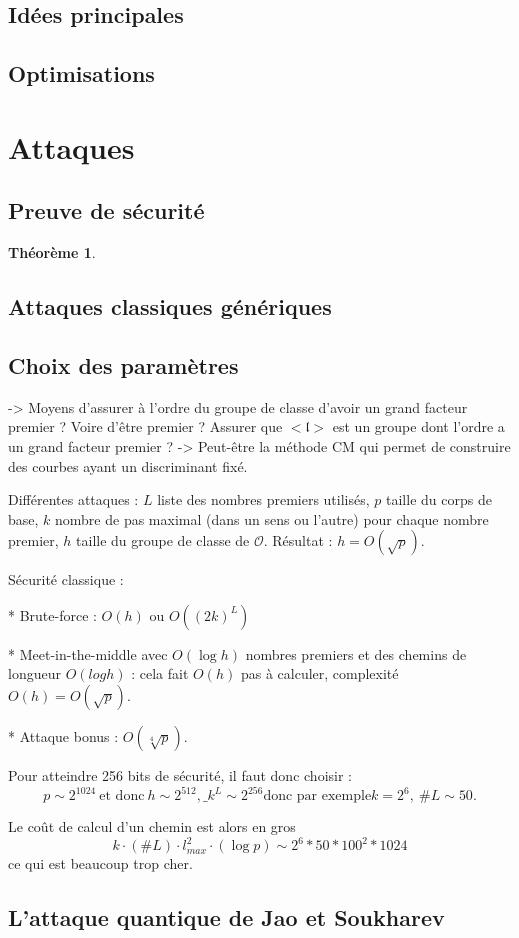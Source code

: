 \documentclass[11pt,a4paper]{article}
\renewcommand{\O}{\mathcal{O}}
\renewcommand{\frak}{\mathfrak}
\newtheorem{thm}{Théorème}[subsection]
\theoremstyle{definition}
\begin{document}
\subsection{Idées principales}

\subsection{Optimisations}


\newpage

\section{Attaques}


\subsection{Preuve de sécurité}


\begin{thm}

\end{thm}


\subsection{Attaques classiques génériques}


\subsection{Choix des paramètres}

-> Moyens d'assurer à l'ordre du groupe de classe d'avoir un grand facteur premier ? Voire d'être premier ? Assurer que $<\frak l>$ est un groupe dont l'ordre a un grand facteur premier ?
-> Peut-être la méthode CM qui permet de construire des courbes ayant un discriminant fixé.

Différentes attaques :
$L$ liste des nombres premiers utilisés, $p$ taille du corps de base, $k$ nombre de pas maximal (dans un sens ou l'autre) pour chaque nombre premier, $h$ taille du groupe de classe de $\O$. Résultat : $h=O(\sqrt{p})$.

Sécurité classique :

* Brute-force : $O(h)$ ou $O((2k)^L)$

* Meet-in-the-middle avec $O(\log h)$ nombres premiers et des chemins de longueur $O(log h)$ : cela fait $O(h)$ pas à calculer, complexité $O(h)=O(\sqrt{p})$.

* Attaque bonus : $O(\sqrt[4]{p})$.

Pour atteindre 256 bits de sécurité, il faut donc choisir :
$$p\sim 2^{1024}\ \text{et donc}\ h\sim 2^{512},\_ k^L\sim 2^{256} \text{donc par exemple} k=2^6,\ \#L\sim 50.$$

Le coût de calcul d'un chemin est alors en gros
$$k\cdot(\#L)\cdot l_{max}^2\cdot (\log p)\sim 2^6*50*100^2*1024$$
ce qui est beaucoup trop cher.

\subsection{L'attaque quantique de Jao et Soukharev}
\end{document}
